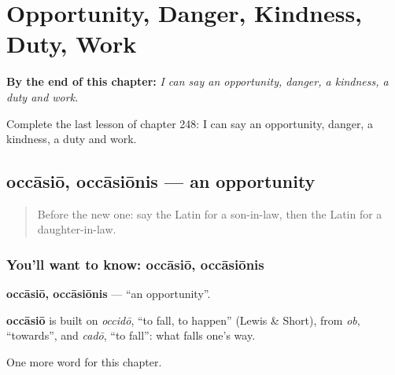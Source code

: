 
\chapter{Opportunity, Danger, Kindness, Duty, Work}
\label{ch:la-opportunity-danger-kindness-duty-work}

\begin{chapteropening}
\textbf{By the end of this chapter:} \emph{I can say an opportunity, danger, a kindness, a duty and work.}

Complete the last lesson of chapter 248: I can say an opportunity, danger, a kindness, a duty and work.
\end{chapteropening}

\section[occāsiō, occāsiōnis]{occāsiō, occāsiōnis — an opportunity}

\label{lesson:LA-C248-occasio}



\begin{quote}
Before the new one: say the Latin for a son-in-law, then the Latin for a daughter-in-law.
\end{quote}

\subsection*{You'll want to know: occāsiō, occāsiōnis}
\textbf{occāsiō, occāsiōnis} — \textquotedblleft{}an opportunity\textquotedblright{}.

\begin{cousinweb}
\textbf{occāsiō} is built on \emph{occidō}, \textquotedblleft{}to fall, to happen\textquotedblright{} (Lewis \& Short), from \emph{ob}, \textquotedblleft{}towards\textquotedblright{}, and \emph{cadō}, \textquotedblleft{}to fall\textquotedblright{}: what falls one's way.
\end{cousinweb}

\begin{grammarlens}[title={What you've built}]
One more word for this chapter.
\end{grammarlens}

